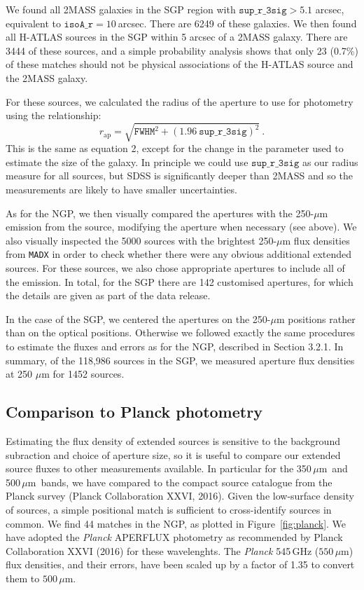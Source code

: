 \documentclass[a4paper,fleqn,usenatbib, twocolumn]{aastex61}
\def\mic{\,$\mu $m}
\begin{document}
We found all 2MASS galaxies in the SGP region with
$\mathtt{sup\_r\_3sig}>5.1$ arcsec, equivalent to
$\mathtt{isoA\_r}=10\ $arcsec. There are 6249 of these galaxies. We
then found all H-ATLAS sources in the SGP within 5 arcsec of a 2MASS
galaxy. There are 3444 of these sources, and a simple probability
analysis shows that only 23 (0.7\%) of these matches should not be
physical associations of the H-ATLAS source and the 2MASS galaxy.

For these sources, we calculated the radius of the aperture
to use for photometry using the relationship:
\smallskip
\begin{equation} 
r_\mathrm{ap} = \sqrt{ \mathtt{FWHM}^2 + {(1.96
    \ \mathtt{sup\_r\_3sig})}^2}\ .
\end{equation}
This is the same as equation 2, except for the change
in the parameter used to estimate the size of the galaxy.
In principle we could use $\mathtt{sup\_r\_3sig}$ as our radius
measure for all sources, but SDSS is significantly deeper than 2MASS
and so the measurements are likely to have smaller uncertainties. 

As for the NGP, we then visually compared the apertures with the
250-$\mu$m emission from the source, modifying the aperture when
necessary (see above).  We also visually inspected the 5000 sources
with the brightest 250-$\mu$m flux densities from {\tt MADX} in order to
check whether there were any obvious additional extended sources.  For
these sources, we also chose appropriate apertures to include all of
the emission.  In total, for the SGP there are 142 customised
apertures, for which the details are given as part of the data
release.

In the case of the SGP, we centered the apertures on the 250-$\mu$m
positions rather than on the optical positions. Otherwise we followed
exactly the same procedures to estimate the fluxes and errors as for
the NGP, described in Section 3.2.1.  In summary, of the 118,986
sources in the SGP, we measured aperture flux densities at 250 $\mu$m
for 1452 sources.

\subsection{ Comparison to Planck photometry}

Estimating the  flux density of extended sources is sensitive to the
background subraction and choice of aperture size, so it is useful to
compare our extended source fluxes to other measurements available. In
particular for the 350\mic\ and 500\mic\ bands, we have compared to the
compact source catalogue from the Planck survey (Planck Collaboration
XXVI, 2016).  Given the low-surface density of sources, a simple
positional match is sufficient to cross-identify sources in common. We
find 44 matches in the NGP, as plotted in Figure~\ref{fig:planck}.
We have
adopted the \textit{Planck} APERFLUX photometry as recommended by
Planck Collaboration XXVI (2016) for these wavelenghts. The
\textit{Planck} 545\,GHz ($550\,\mu$m) flux densities, and their
errors, have been scaled up by a factor of 1.35 to convert them to
$500\,\mu$m.
\end{document}
